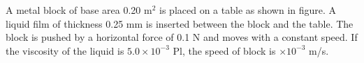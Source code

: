 \item A metal block of base area 0.20 m\(^2\) is placed on a table as shown in figure. A liquid film of thickness 0.25 mm is inserted between the block and the table. The block is pushed by a horizontal force of 0.1 N and moves with a constant speed. If the viscosity of the liquid is \(5.0 \times 10^{-3}\) Pl, the speed of block is \underline{\hspace{2.5cm}} \(\times 10^{-3}\) m/s.
    \begin{center}
    \end{center}